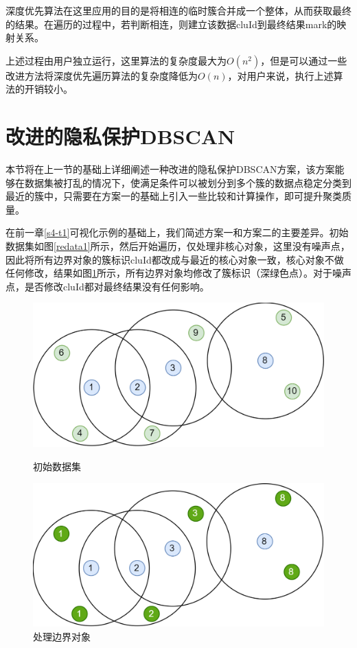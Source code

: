 深度优先算法在这里应用的目的是将相连的临时簇合并成一个整体，从而获取最终的结果。在遍历的过程中，若判断相连，则建立该数据cluId到最终结果mark的映射关系。

上述过程由用户独立运行，这里算法的复杂度最大为$ O(n^2) $，但是可以通过一些改进方法将深度优先遍历算法的复杂度降低为$ O(n) $，对用户来说，执行上述算法的开销较小。

\section{改进的隐私保护DBSCAN}
\label{s4-t2}
本节将在上一节的基础上详细阐述一种改进的隐私保护DBSCAN方案，该方案能够在数据集被打乱的情况下，使满足条件可以被划分到多个簇的数据点稳定分类到最近的簇中，只需要在方案一的基础上引入一些比较和计算操作，即可提升聚类质量。

在前一章\ref{s4-t1}可视化示例的基础上，我们简述方案一和方案二的主要差异。初始数据集如图\ref{redata1}所示，然后开始遍历，仅处理非核心对象，这里没有噪声点，因此将所有边界对象的簇标识cluId都改成与最近的核心对象一致，核心对象不做任何修改，结果如图\ref{redata2}所示，所有边界对象均修改了簇标识（深绿色点）。对于噪声点，是否修改cluId都对最终结果没有任何影响。

\begin{figure}[!h]
	\begin{minipage}[t]{0.48\linewidth}
		\centering
		\includegraphics[width=\linewidth]{img/db1.png}
		\caption{初始数据集}
		\label{redata1}
	\end{minipage}
	\hfill
	\begin{minipage}[t]{0.48\linewidth}
		\centering
		\includegraphics[width=\linewidth]{img/redbscan.png}
		\caption{处理边界对象}
		\label{redata2}
	\end{minipage}
\end{figure}

